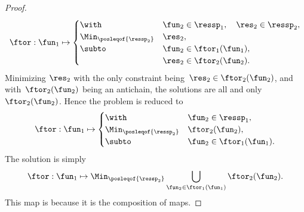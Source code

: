 \begin{proof}
	\begin{equation}
		\ftor:\fun_{1}\mapsto\begin{cases}
			\with                        & \fun_{2}\in\ressp_{1},\quad\res_{2}\in\ressp_{2}, \\
			\Min_{\posleqof{\ressp_{2}}} & \res_{2},                                         \\
			\subto                       & \fun_{2}\in\ftor_{1}(\fun_{1}),                   \\
			                             & \res_{2}\in\ftor_{2}(\fun_{2}).
		\end{cases}\label{eq:dede-2}
	\end{equation}
	Minimizing $\res_{2}$ with the only constraint being~$\res_{2}\in\ftor_{2}(\fun_{2})$, and with~$\ftor_{2}(\fun_{2})$ being an antichain, the solutions are all and only~$\ftor_{2}(\fun_{2})$.
	Hence the problem is reduced to
	\begin{equation}
		\ftor:\fun_{1}\mapsto\begin{cases}
			\with                        & \fun_{2}\in\ressp_{1},          \\
			\Min_{\posleqof{\ressp_{2}}} & \ftor_{2}(\fun_{2}),            \\
			\subto                       & \fun_{2}\in\ftor_{1}(\fun_{1}).
		\end{cases}\label{eq:dede-2-1}
	\end{equation}
	The solution is simply
	\begin{equation}
		\ftor:\fun_{1}\mapsto\Min_{\posleqof{\ressp_{2}}}\bigcup_{\fun_{2}\in\ftor_{1}(\fun_{1})}\ftor_{2}(\fun_{2}).
		\label{eq:ora}
	\end{equation}
	This map is \scottcontinuous because it is the composition of \scottcontinuous maps.
\end{proof}


